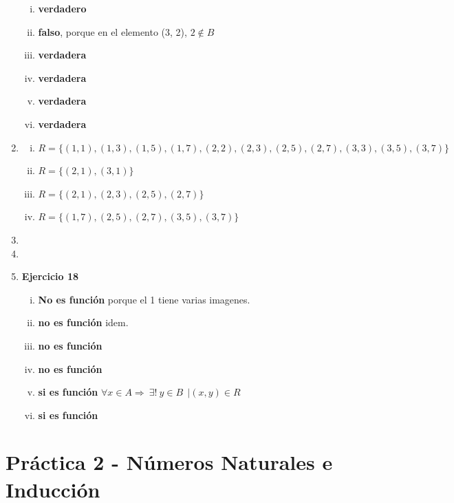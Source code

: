 \documentclass[12pt]{book}
\begin{document}
\begin{enumerate}
\begin{enumerate}[i)]
	\item \textbf{verdadero}
	\item \textbf{falso}, porque en el elemento (3, 2),  $2 \notin B $
	\item \textbf{verdadera}
	\item \textbf{verdadera}
	\item \textbf{verdadera}
	\item \textbf{verdadera}
\end{enumerate}	

	\item %

\begin{enumerate}[i)]
	\item 	$	R = \{ (1, 1), (1, 3), (1, 5), (1, 7),(2,2),(2, 3), (2, 5), (2, 7),(3,3),(3, 5), (3, 7) \} $
	\item $	R = \{ (2, 1), (3,1) \} $
	\item $	R = \{ (2, 1), (2,3), (2,5), (2,7) \} $
	\item $	R = \{ (1, 7), (2, 5),(2,7), (3, 5), (3, 7) \} $
\end{enumerate}	

	\item %
	\item %
	
	\item %
\textbf{Ejercicio 18}
\begin{enumerate}[i)]
	\item \textbf{No es funci\'on} porque el 1 tiene varias imagenes.
	\item \textbf{no es funci\'on} idem.
	\item \textbf{no es funci\'on}
	\item \textbf{no es funci\'on}
	\item \textbf{si es funci\'on} $ \forall x \in A \Rightarrow \ \exists ! 	\ y \in B \ \ \vert (x,y) \in R$
	\item \textbf{si es funci\'on}
\end{enumerate}	
		
\end{enumerate}
	
\chapter{Práctica 2 - Números Naturales e Inducción} 
%
\end{document}
